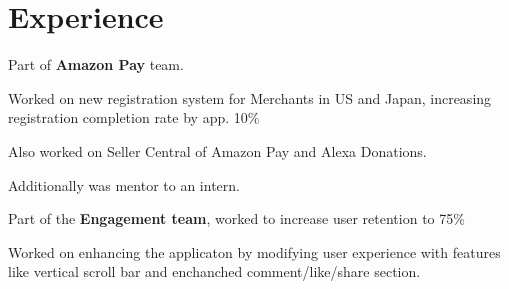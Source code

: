 \documentclass[a4paper]{deedy-resume} %
\begin{document}
\hfill
%
%
\begin{minipage}[t]{0.66\textwidth} %


\section{Experience}


\vspace{\topsep}
\begin{tightitemize}
\item Part of \textbf{Amazon Pay} team.
\item Worked on new registration system for Merchants in US and Japan, increasing registration completion rate by app. 10\%
\item Also worked on Seller Central of Amazon Pay and Alexa Donations.
\item Additionally was mentor to an intern.
\end{tightitemize}

\sectionspace %



\begin{tightitemize}
\item Part of the \textbf{Engagement team}, worked to increase user retention to 75\%
\item Worked on enhancing the applicaton by modifying user experience with features like vertical scroll bar and enchanched comment/like/share section.
\end{tightitemize}

\sectionspace %




\end{minipage}
\end{document}
